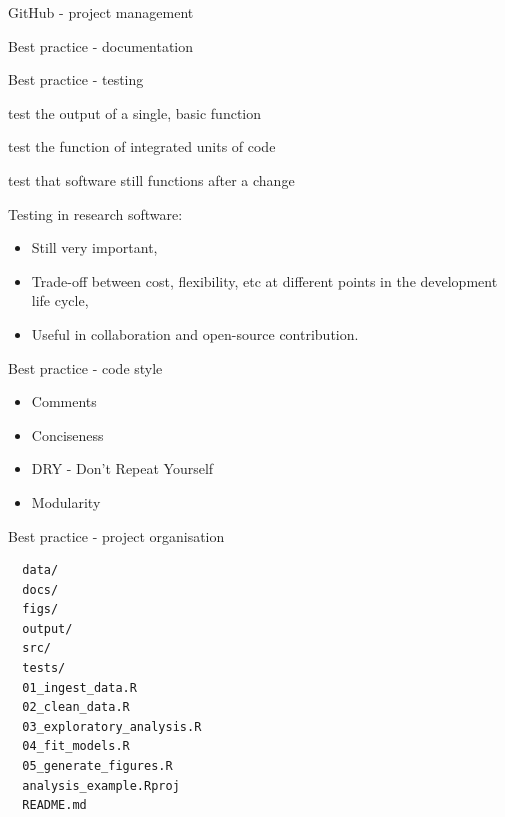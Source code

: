 \documentclass{beamer} %
\begin{document}
  \begin{frame}{GitHub - project management}
  \end{frame}

  \begin{frame}{Best practice - documentation}
  \end{frame}

  \begin{frame}[fragile]{Best practice - testing}
    \begin{tcolorbox}[skin=beamer,adjusted title=Unit Tests]
      test the output of a single, basic function
    \end{tcolorbox}
    
    \begin{tcolorbox}[skin=beamer,adjusted title=Integration Tests]
      test the function of integrated units of code
    \end{tcolorbox}
    
    \begin{tcolorbox}[skin=beamer,adjusted title=Regression Tests]
      test that software still functions after a change
    \end{tcolorbox}
    
    \tiny
    Testing in research software:
    \begin{itemize}
      \item Still very important,
      \item Trade-off between cost, flexibility, etc at different points in the development life cycle,
      \item Useful in collaboration and open-source contribution.
    \end{itemize}
  \end{frame}

  \begin{frame}{Best practice - code style}
    \pause
    \begin{itemize}
      \item Comments
      \item Conciseness
      \item DRY - Don't Repeat Yourself
      \item Modularity
    \end{itemize}
  \end{frame}

  \begin{frame}[fragile]{Best practice - project organisation}
        \small
        \begin{verbatim}
  data/
  docs/
  figs/
  output/
  src/
  tests/
  01_ingest_data.R
  02_clean_data.R
  03_exploratory_analysis.R
  04_fit_models.R
  05_generate_figures.R
  analysis_example.Rproj
  README.md\end{verbatim}
  \end{frame}
\end{document}

